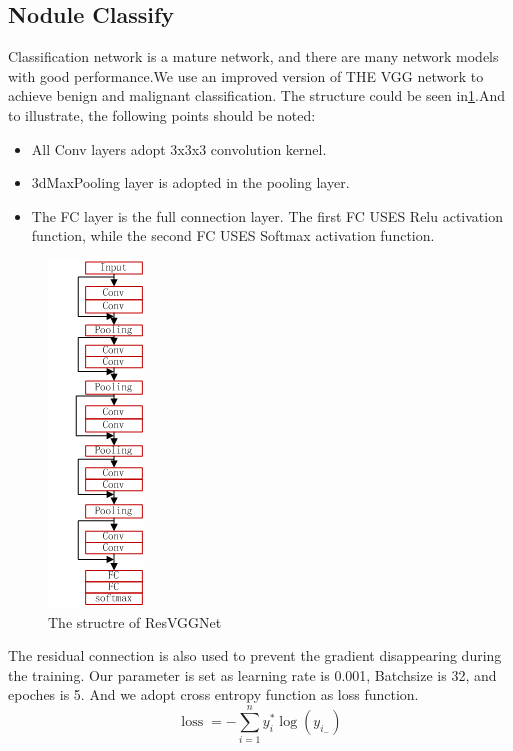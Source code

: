 \documentclass[conference]{IEEEtran}
\begin{document}
\begin{CJK}{UTF8}{gbsn}
\subsection{Nodule Classify}
Classification network is a mature network, and there are many network models with good performance.We use an improved version of THE VGG network to achieve benign and malignant classification. The structure could be seen in\ref{fig4}.And to illustrate, the following points should be noted:
\begin{itemize}
    \item All Conv layers adopt 3x3x3 convolution kernel.
    \item 3dMaxPooling layer is adopted in the pooling layer.
    \item The FC layer is the full connection layer. The first FC USES Relu activation function, while the second FC USES Softmax activation function.
\end{itemize}
\begin{figure}[htbp]
    \centerline{\includegraphics[scale=0.5]{ResVGGNet.png}}
    \caption{The structre of ResVGGNet}
    \label{fig4}
    \end{figure}
The residual connection is also used to prevent the gradient disappearing during the training. Our parameter is set as learning rate is 0.001, Batchsize is 32, and epoches is 5.
And we adopt cross entropy function as loss function.
\begin{equation}\operatorname{loss}=-\sum_{i=1}^{n} y_{i}^{*} \log \left(y_{i_{-}}\right)\end{equation}

\end{CJK}
\end{document}
